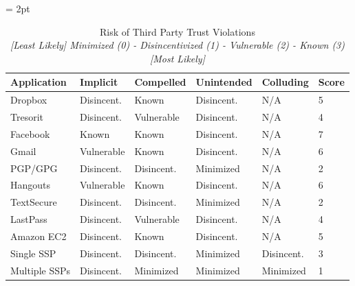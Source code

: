 \begin{table}[!hb]
  \footnotesize
  \centering
  \tabulinesep = 2pt
  \begin{tabu} to \textwidth
    { | X[1,c,m]
      | X[1,c,m]
      | X[1,c,m]
      | X[1,c,m]
      | X[1,c,m]
      | X[0.5,c,m]
      | }
    \hline
    \textbf{Application}
    & \textbf{Implicit}
    & \textbf{Compelled}
    & \textbf{Unintended}
    & \textbf{Colluding}
    & \textbf{Score}
    \\ \hline
    \rowfont{\color{blue}}
    Dropbox
    & Disincent.
    & Known
    & Disincent.
    & N/A
    & 5
    \\ \hline
    \rowfont{\color{orange}}
    Tresorit
    & Disincent.
    & Vulnerable
    & Disincent.
    & N/A
    & 4
    \\ \hline
    \rowfont{\color{blue}}
    Facebook
    & Known
    & Known
    & Disincent.
    & N/A
    & 7
    \\ \hline
    \rowfont{\color{blue}}
    Gmail
    & Vulnerable
    & Known
    & Disincent.
    & N/A
    & 6
    \\ \hline
    \rowfont{\color{orange}}
    PGP/GPG
    & Disincent.
    & Disincent.
    & Minimized
    & N/A
    & 2
    \\ \hline
    \rowfont{\color{blue}}
    Hangouts
    & Vulnerable
    & Known
    & Disincent.
    & N/A
    & 6
    \\ \hline
    \rowfont{\color{orange}}
    TextSecure
    & Disincent.
    & Disincent.
    & Minimized
    & N/A
    & 2
    \\ \hline
    \rowfont{\color{orange}}
    LastPass
    & Disincent.
    & Vulnerable
    & Disincent.
    & N/A
    & 4
    \\ \hline
    \rowfont{\color{blue}}
    Amazon EC2
    & Disincent.
    & Known
    & Disincent.
    & N/A
    & 5
    \\ \hline
    \rowfont{\color{ForestGreen}}
    Single SSP
    & Disincent.
    & Disincent.
    & Minimized
    & Disincent.
    & 3
    \\ \hline
    \rowfont{\color{ForestGreen}}
    Multiple SSPs
    & Disincent.
    & Minimized
    & Minimized
    & Minimized
    & 1
    \\ \hline
  \end{tabu}
  \caption[Risk of Third Party Trust Violations]{
    Risk of Third Party Trust Violations\\
    \textit{[Least Likely] Minimized (0) - Disincentivized (1) -
      Vulnerable (2) - Known (3) [Most Likely]}
  }
  \label{tab:trust:app:threats}
\end{table}

